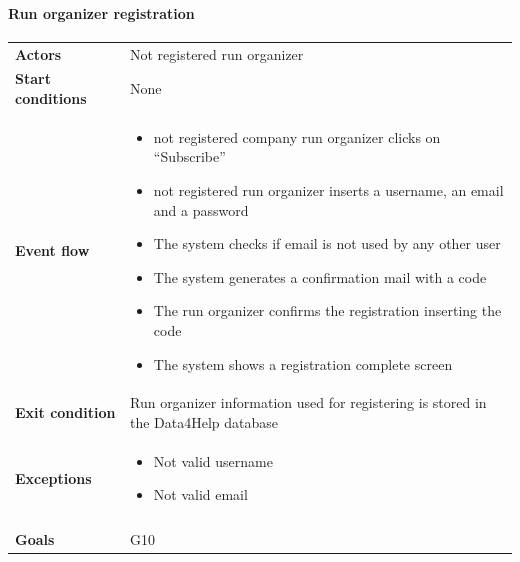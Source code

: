 











\newpage
\paragraph{Run organizer registration}
\begin{center}
\begin{table}[H]
\centering
\begin{tabular}{l|p{}}
\textbf{Actors} & Not registered run organizer \\
\textbf{Start conditions} & None \\
\textbf{Event flow}  & \begin{minipage}[t]{0.7\textwidth}
    \begin{itemize}
       \item not registered company run organizer clicks on “Subscribe”
\item not registered run organizer inserts a username, an email and a password
\item The system checks if email is not used by any other user
\item The system generates a confirmation mail with a code
\item The run organizer confirms the registration inserting the code
\item The system shows a registration complete screen


    \end{itemize}
    
\end{minipage} \\
\textbf{Exit condition} & Run organizer information used for registering is stored in the Data4Help database \\
\textbf{Exceptions} & \begin{minipage}[t]{0.7\textwidth}
    \begin{itemize}
       \item Not valid username
\item Not valid email
    \end{itemize}
    
\end{minipage} \\ \\
\textbf{Goals} & G10
\end{tabular}

\end{table}
\end{center}
